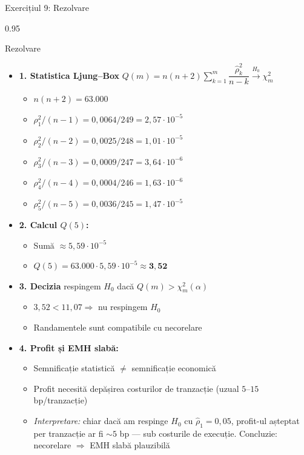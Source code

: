 \documentclass[9pt, aspectratio=169, t]{beamer}
\begin{document}
\begin{frame}[shrink=25]{Exercițiul 9: Rezolvare}
\begin{cminipage}{0.95\textwidth}
\begin{exampleblock}{Rezolvare}
\small
\begin{itemize}\setlength{\itemsep}{0pt}
    \item \textbf{1. Statistica Ljung--Box} \quad $Q(m) = n(n+2)\sum_{k=1}^{m}\dfrac{\hat\rho_k^2}{n-k} \xrightarrow{H_0} \chi^2_m$
    \begin{itemize}\setlength{\itemsep}{0pt}
        \item $n(n+2) = 63.000$
        \item $\rho_1^2/(n-1) = 0{,}0064/249 = 2{,}57 \cdot 10^{-5}$
        \item $\rho_2^2/(n-2) = 0{,}0025/248 = 1{,}01 \cdot 10^{-5}$
        \item $\rho_3^2/(n-3) = 0{,}0009/247 = 3{,}64 \cdot 10^{-6}$
        \item $\rho_4^2/(n-4) = 0{,}0004/246 = 1{,}63 \cdot 10^{-6}$
        \item $\rho_5^2/(n-5) = 0{,}0036/245 = 1{,}47 \cdot 10^{-5}$
    \end{itemize}
    \item \textbf{2. Calcul $Q(5)$:}
    \begin{itemize}\setlength{\itemsep}{0pt}
        \item Sumă $\approx 5{,}59 \cdot 10^{-5}$
        \item $Q(5) = 63.000 \cdot 5{,}59 \cdot 10^{-5} \approx \mathbf{3{,}52}$
    \end{itemize}
    \item \textbf{3. Decizia} \quad respingem $H_0$ dacă $Q(m) > \chi^2_m(\alpha)$
    \begin{itemize}\setlength{\itemsep}{0pt}
        \item $3{,}52 < 11{,}07 \Rightarrow$ nu respingem $H_0$
        \item Randamentele sunt compatibile cu necorelare
    \end{itemize}
    \item \textbf{4. Profit și EMH slabă:}
    \begin{itemize}\setlength{\itemsep}{0pt}
        \item Semnificație statistică $\neq$ semnificație economică
        \item Profit necesită depășirea costurilor de tranzacție (uzual $5$--$15$ bp/tranzacție)
        \item \textit{Interpretare:} chiar dacă am respinge $H_0$ cu $\hat\rho_1 = 0{,}05$, profit-ul așteptat per tranzacție ar fi $\sim 5$ bp --- sub costurile de execuție. Concluzie: necorelare $\Rightarrow$ EMH slabă plauzibilă
    \end{itemize}
\end{itemize}
\end{exampleblock}
\end{cminipage}
\end{frame}
\end{document}
